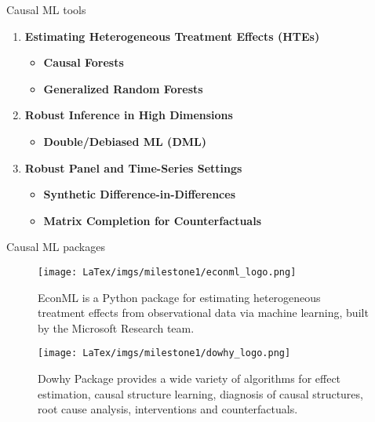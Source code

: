 \documentclass{beamer}
\begin{document}
    \begin{frame}{Causal ML tools}
    \begin{enumerate}
        \item \textbf{Estimating Heterogeneous Treatment Effects (HTEs)}
            \begin{itemize}
                \item \textbf{Causal Forests} \parencite{athey2018estimation}
                \item \textbf{Generalized Random Forests} \parencite{athey2019generalized}
            \end{itemize}
            
        \item \textbf{Robust Inference in High Dimensions}
            \begin{itemize}
                \item \textbf{Double/Debiased ML (DML)} \parencite{chernozhukov2018double}
            \end{itemize}
            
        \item \textbf{Robust Panel and Time-Series Settings}
            \begin{itemize}
                \item \textbf{Synthetic Difference-in-Differences} \parencite{arkhangelsky2021synthetic}
                \item \textbf{Matrix Completion for Counterfactuals} \parencite{athey2021matrix}
            \end{itemize}
    \end{enumerate}

    \end{frame}

    \begin{frame}{Causal ML packages}
    \begin{figure}
    \centering
    \begin{minipage}{0.45\linewidth}
        \centering
        \texttt{[image: LaTex/imgs/milestone1/econml\_logo.png]}
        \caption{EconML is a Python package for estimating heterogeneous treatment effects from observational data via machine learning, built by the Microsoft Research team.}
        \label{fig:econml}
    \end{minipage}%
    \hfill
    \begin{minipage}{0.5\linewidth}
        \centering
        \texttt{[image: LaTex/imgs/milestone1/dowhy\_logo.png]}
        \caption{Dowhy Package provides a wide variety of algorithms for effect estimation, causal structure learning, diagnosis of causal structures, root cause analysis, interventions and counterfactuals.}
        \label{fig:dowhy}
    \end{minipage}
    \end{figure}

    \end{frame}
    
\end{document}
